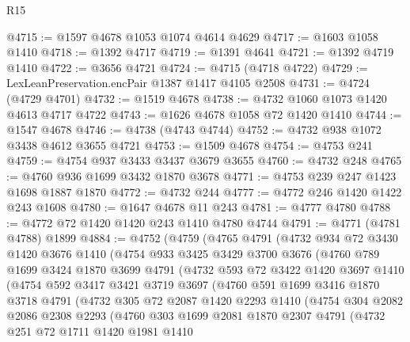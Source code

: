 \begin{lexlean}{R15}
\begin{coremodule}
@4715 := @1597 @4678 @1053 @1074 @4614 @4629
@4717 := @1603 @1058 @1410
@4718 := @1392 @4717
@4719 := @1391 @4641
@4721 := @1392 @4719 @1410
@4722 := @3656 @4721
@4724 := @4715 (@4718 @4722)
@4729 := LexLeanPreservation.encPair @1387 @1417 @4105 @2508
@4731 := @4724 (@4729 @4701)
@4732 := @1519 @4678
@4738 := @4732 @1060 @1073 @1420 @4613 @4717 @4722
@4743 := @1626 @4678 @1058 @72 @1420 @1410
@4744 := @1547 @4678
@4746 := @4738 (@4743 @4744)
@4752 := @4732 @938 @1072 @3438 @4612 @3655 @4721
@4753 := @1509 @4678
@4754 := @4753 @241
@4759 := @4754 @937 @3433 @3437 @3679 @3655
@4760 := @4732 @248
@4765 := @4760 @936 @1699 @3432 @1870 @3678
@4771 := @4753 @239 @247 @1423 @1698 @1887 @1870
@4772 := @4732 @244
@4777 := @4772 @246 @1420 @1422 @243 @1608
@4780 := @1647 @4678 @11 @243
@4781 := @4777 @4780
@4788 := @4772 @72 @1420 @1420 @243 @1410 @4780 @4744
@4791 := @4771 (@4781 @4788) @1899
@4884 := @4752
    (@4759
      (@4765
        @4791
        (@4732
          @934
          @72
          @3430
          @1420
          @3676
          @1410
          (@4754
            @933
            @3425
            @3429
            @3700
            @3676
            (@4760
              @789
              @1699
              @3424
              @1870
              @3699
              @4791
              (@4732
                @593
                @72
                @3422
                @1420
                @3697
                @1410
                (@4754
                  @592
                  @3417
                  @3421
                  @3719
                  @3697
                  (@4760
                    @591
                    @1699
                    @3416
                    @1870
                    @3718
                    @4791
                    (@4732
                      @305
                      @72
                      @2087
                      @1420
                      @2293
                      @1410
                      (@4754
                        @304
                        @2082
                        @2086
                        @2308
                        @2293
                        (@4760
                          @303
                          @1699
                          @2081
                          @1870
                          @2307
                          @4791
                          (@4732
                            @251
                            @72
                            @1711
                            @1420
                            @1981
                            @1410

\end{coremodule}
\end{lexlean}
